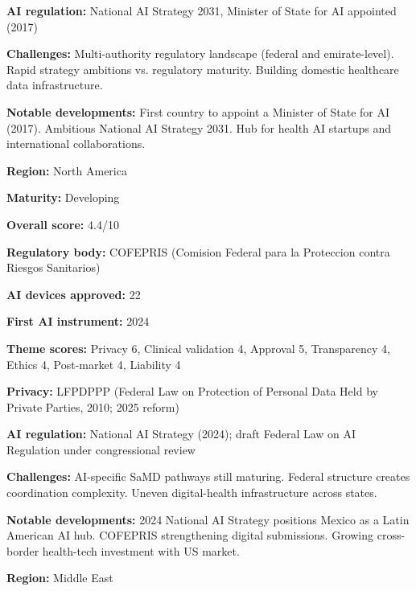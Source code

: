 \noindent\textbf{AI regulation:} National AI Strategy 2031, Minister of State for AI appointed (2017)\par
\noindent\textbf{Challenges:} Multi-authority regulatory landscape (federal and emirate-level). Rapid strategy ambitions vs. regulatory maturity. Building domestic healthcare data infrastructure.\par
\noindent\textbf{Notable developments:} First country to appoint a Minister of State for AI (2017). Ambitious National AI Strategy 2031. Hub for health AI startups and international collaborations.\par
\vspace{0.55em}
\par
\vspace{0.15em}
\noindent\textbf{Region:} North America\par
\noindent\textbf{Maturity:} Developing\par
\noindent\textbf{Overall score:} 4.4/10\par
\noindent\textbf{Regulatory body:} COFEPRIS (Comision Federal para la Proteccion contra Riesgos Sanitarios)\par
\noindent\textbf{AI devices approved:} 22\par
\noindent\textbf{First AI instrument:} 2024\par
\noindent\textbf{Theme scores:} Privacy 6, Clinical validation 4, Approval 5, Transparency 4, Ethics 4, Post-market 4, Liability 4\par
\noindent\textbf{Privacy:} LFPDPPP (Federal Law on Protection of Personal Data Held by Private Parties, 2010; 2025 reform)\par
\noindent\textbf{AI regulation:} National AI Strategy (2024); draft Federal Law on AI Regulation under congressional review\par
\noindent\textbf{Challenges:} AI-specific SaMD pathways still maturing. Federal structure creates coordination complexity. Uneven digital-health infrastructure across states.\par
\noindent\textbf{Notable developments:} 2024 National AI Strategy positions Mexico as a Latin American AI hub. COFEPRIS strengthening digital submissions. Growing cross-border health-tech investment with US market.\par
\vspace{0.55em}
\par
\vspace{0.15em}
\noindent\textbf{Region:} Middle East\par
